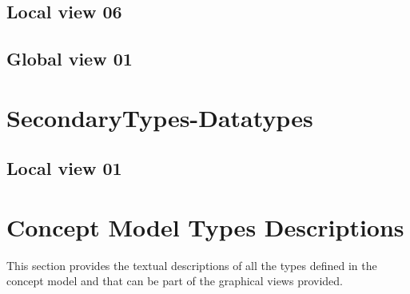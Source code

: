 \subsection{Local view 06}
\label{sec:lu.uni.lassy.icrash.spec.messir.reference-CM-view-local-PrimaryTypes-Datatypes-06}


\subsection{Global view 01}
\label{sec:lu.uni.lassy.icrash.spec.messir.reference-CM-view-global-PrimaryTypes-Datatypes-01}





\section{SecondaryTypes-Datatypes}
\subsection{Local view 01}
\label{sec:lu.uni.lassy.icrash.spec.messir.reference-CM-view-local-SecondaryTypes-Datatypes-01}






\section{Concept Model Types Descriptions}
This section provides the textual descriptions of all the types defined in the concept model and that can be part of the graphical views provided.












